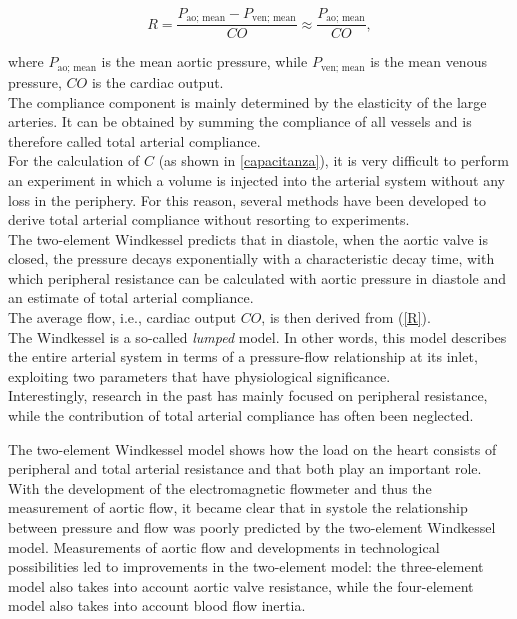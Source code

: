 \begin{equation}\label{R}
R = \frac{ P_{\text{ao; mean}}-P_{\text{ven; mean}}}{CO}\approx \frac{ P_{\text{ao; mean}}}{CO},
\end{equation}

where $P_{\text{ao; mean}}$ is the mean aortic pressure, while $P_{\text{ven; mean}}$ is the mean venous pressure, $CO$ is the cardiac output.\\
The compliance component is mainly
determined by the elasticity of the large
arteries. It can be obtained by summing the compliance
of all vessels and is therefore called total arterial compliance.\\
For the calculation of $C$ (as shown in \ref{capacitanza}), it is very difficult to perform an experiment in which a volume is injected into the arterial system without any loss in the periphery. For this reason, several methods have been developed to derive total arterial compliance without resorting to experiments.\\
The two-element Windkessel predicts that in diastole,
when the aortic valve is closed, the pressure decays
exponentially with a characteristic decay time, with which peripheral resistance can be calculated with aortic pressure in diastole and an estimate of total arterial compliance.\\
The average flow, i.e., cardiac output $CO$, is then derived from (\ref{R}). \\
The Windkessel is a so-called \textit{lumped} model. In other words, this model describes the entire arterial system
in terms of a pressure-flow relationship at its inlet,
exploiting two parameters that have physiological significance.\\
Interestingly, research in the past has mainly focused on peripheral resistance, while the contribution of total arterial compliance has often been neglected. 


The two-element Windkessel model shows how the load on the heart consists of peripheral and total arterial resistance and that both play an important role.\\

With the development of the electromagnetic flowmeter and thus the measurement of aortic flow, it became clear that in systole the relationship between pressure and flow was poorly predicted by the two-element Windkessel model. Measurements of aortic flow and developments in technological possibilities led to improvements in the two-element model: the three-element model also takes into account aortic valve resistance, while the four-element model also takes into account blood flow inertia.\\

